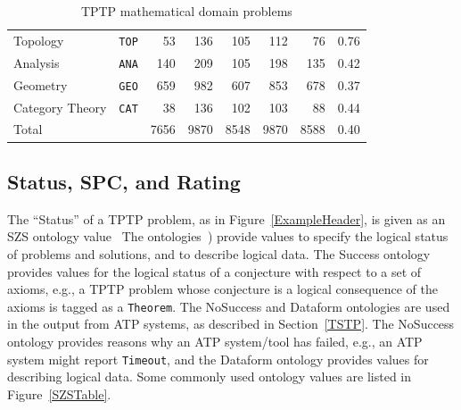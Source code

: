 \documentclass[runningheads]{llncs}
\begin{document}
\begin{table}[tb]
\begin{center}
\begin{tabular}{lr|rr|rrrr}
Topology            & {\tt TOP} &   53 &  136 &  105 &  112 &   76 & 0.76 \\
Analysis            & {\tt ANA} &  140 &  209 &  105 &  198 &  135 & 0.42 \\
Geometry            & {\tt GEO} &  659 &  982 &  607 &  853 &  678 & 0.37 \\
Category Theory     & {\tt CAT} &   38 &  136 &  102 &  103 &   88 & 0.44 \\
\hline
Total               &           & 7656 & 9870 & 8548 & 9870 & 8588 & 0.40 \\
\end{tabular}
\end{center}
\caption{TPTP mathematical domain problems}
\label{Domains}
\end{table}

\subsection{Status, SPC, and Rating}
\label{Characteristics}

The ``Status'' of a TPTP problem, as in Figure~\ref{ExampleHeader}, is given as an SZS ontology 
value~\cite{Sut08-KEAPPA}
The ontologies~\cite{SZS03}) provide values to specify the logical status of problems and
solutions, and to describe logical data.
The Success ontology provides values for the logical status of a conjecture with respect to a 
set of axioms, e.g., a TPTP problem whose conjecture is a logical consequence of the axioms 
is tagged as a {\tt Theorem}.
The NoSuccess and Dataform ontologies are used in the output from ATP systems, as described in
Section~\ref{TSTP}.
The NoSuccess ontology provides reasons why an ATP system/tool has failed, e.g., an ATP system 
might report {\tt Timeout}, and the Dataform ontology provides values for describing logical 
data.
Some commonly used ontology values are listed in Figure~\ref{SZSTable}.

\end{document}

